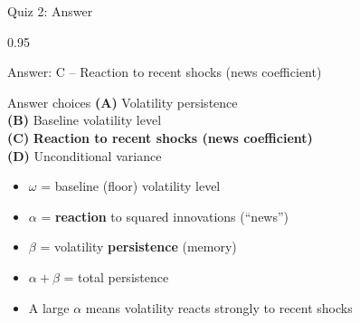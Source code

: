\documentclass[9pt, aspectratio=169, t]{beamer}
\begin{document}
\begin{frame}{Quiz 2: Answer}
    \begin{cminipage}{0.95\textwidth}
    {\small
    \begin{exampleblock}{Answer: C -- Reaction to recent shocks (news coefficient)}

    \vspace{0.1cm}

    \begin{block}{Answer choices}
        \textcolor{MainBlue}{\textbf{(A)}} Volatility persistence \incorrect\\[2pt]
        \textcolor{MainBlue}{\textbf{(B)}} Baseline volatility level \incorrect\\[2pt]
        \textcolor{MainBlue}{\textbf{(C)}} \textbf{\textcolor{Forest}{Reaction to recent shocks (news coefficient)}} \correct\\[2pt]
        \textcolor{MainBlue}{\textbf{(D)}} Unconditional variance \incorrect
    \end{block}

        \vspace{0.1cm}

        \begin{itemize}\setlength{\itemsep}{0pt}
            \item $\omega$ = baseline (floor) volatility level
            \item $\alpha$ = \textbf{reaction} to squared innovations (``news'')
            \item $\beta$ = volatility \textbf{persistence} (memory)
            \item $\alpha + \beta$ = total persistence
            \item A large $\alpha$ means volatility reacts strongly to recent shocks
        \end{itemize}
    \end{exampleblock}
    }

    \end{cminipage}
\end{frame}
\end{document}
